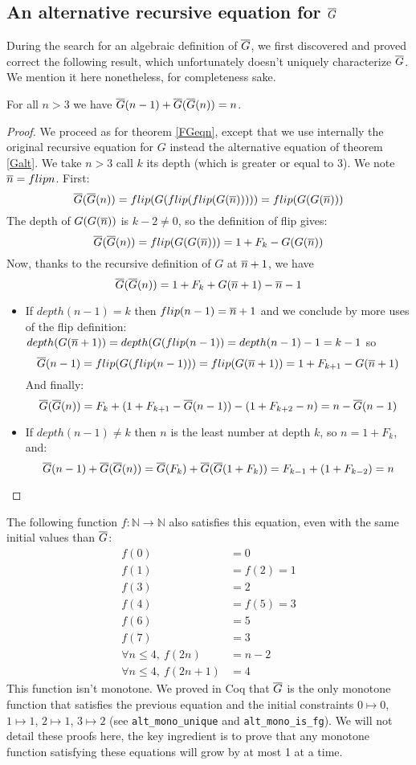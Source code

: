 \documentclass[a4paper,11pt]{article}
\begin{document}
\subsection{An alternative recursive equation for $\overline{G}$}

During the search for an algebraic definition of $\overline{G}$, we
first discovered and proved correct the following result,
which unfortunately doesn't uniquely characterize $\overline{G}$.
We mention it here nonetheless, for completeness sake.

\begin{theorem}
For all $n>3$ we have $\overline{G}(n-1) +\overline{G}(\overline{G}(n)) = n$.
\end{theorem}
\begin{proof}
We proceed as for theorem \ref{FGeqn}, except that we
use internally the original recursive equation for $G$
instead the alternative equation of theorem \ref{Galt}.
We take $n>3$ call $k$ its depth (which is greater or equal to 3).
We note $\overline{n} = flip n$. First:
$$\overline{G}(\overline{G}(n))=flip(G(flip(flip(G(\overline{n})))))=flip(G(G(\overline{n})))$$
The depth of $G(G(\overline{n}))$ is $k-2\neq 0$, so the definition
of flip gives:
$$\overline{G}(\overline{G}(n)) = flip(G(G(\overline{n}))) = 1+F_k-G(G(\overline{n}))$$
Now, thanks to the recursive definition of $G$ at $\overline{n}+1$, we have
$$\overline{G}(\overline{G}(n)) = 1+F_k+G(\overline{n}+1)-\overline{n}-1$$
\begin{itemize}
\item If $depth(n-1)=k$ then $flip(n-1)=\overline{n}+1$ and we
conclude by more uses of the flip definition:
$depth(G(\overline{n}+1))=depth(G(flip(n-1))=depth(n-1)-1=k-1$ so
$$\overline{G}(n-1)=flip(G(flip(n-1)))=flip(G(\overline{n}+1))= 1+F_{k+1}-G(\overline{n}+1)$$
And finally:
$$\overline{G}(\overline{G}(n)) = F_k + (1+F_{k+1}-\overline{G}(n-1))-(1+F_{k+2}-n) = n-\overline{G}(n-1)$$

\item If $depth(n-1)\neq k$ then $n$ is the least number at
depth $k$, so $n=1+F_k$, and:
$$\overline{G}(n-1) + \overline{G}(\overline{G}(n)) = \overline{G}(F_k)+\overline{G}(\overline{G}(1+F_k)) =
F_{k-1}+(1+F_{k-2}) = n$$
\end{itemize}
\end{proof}

The following function $f:\mathbb{N}\to\mathbb{N}$
also satisfies this equation, even with the same initial
values than $\overline{G}$:
\begin{align*}
   f(0) & = 0 \\
   f(1) & = f(2)=1  \\
   f(3) & = 2 \\
   f(4) & =f(5) = 3 \\
   f(6) & = 5 \\
   f(7) & = 3 \\
 \forall n\le 4, ~ f(2n) & = n-2 \\
 \forall n\le 4, ~ f(2n+1) & = 4
\end{align*}
This function isn't monotone. We proved in Coq that
$\overline{G}$ is the only monotone function that satisfies the previous
equation and the initial constraints $0\mapsto 0$, $1\mapsto 1$, $2\mapsto 1$, $3\mapsto
2$ (see {\tt alt\_mono\_unique} and {\tt alt\_mono\_is\_fg}).
We will not detail these proofs here, the key ingredient is to
prove that any monotone function satisfying these equations
will grow by at most 1 at a time.
\end{document}
